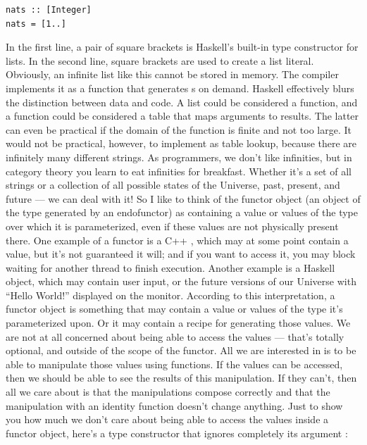 \begin{Verbatim}
nats :: [Integer]
nats = [1..]
\end{Verbatim}
In the first line, a pair of square brackets is Haskell's built-in
type constructor for lists. In the second line, square brackets are used
to create a list literal. Obviously, an infinite list like this cannot
be stored in memory. The compiler implements it as a function that
generates s on demand. Haskell effectively blurs the
distinction between data and code. A list could be considered a
function, and a function could be considered a table that maps arguments
to results. The latter can even be practical if the domain of the
function is finite and not too large. It would not be practical,
however, to implement  as table lookup, because there are
infinitely many different strings. As programmers, we don't like
infinities, but in category theory you learn to eat infinities for
breakfast. Whether it's a set of all strings or a collection of all
possible states of the Universe, past, present, and future --- we can
deal with it! So I like to think of the functor object (an object of the
type generated by an endofunctor) as containing a value or values of the
type over which it is parameterized, even if these values are not
physically present there. One example of a functor is a C++
, which may at some point contain a value, but it's
not guaranteed it will; and if you want to access it, you may block
waiting for another thread to finish execution. Another example is a
Haskell  object, which may contain user input, or the future
versions of our Universe with ``Hello World!'' displayed on the monitor.
According to this interpretation, a functor object is something that may
contain a value or values of the type it's parameterized upon. Or it may
contain a recipe for generating those values. We are not at all
concerned about being able to access the values --- that's totally
optional, and outside of the scope of the functor. All we are interested
in is to be able to manipulate those values using functions. If the
values can be accessed, then we should be able to see the results of
this manipulation. If they can't, then all we care about is that the
manipulations compose correctly and that the manipulation with an
identity function doesn't change anything. Just to show you how much we
don't care about being able to access the values inside a functor
object, here's a type constructor that ignores completely its argument
:

